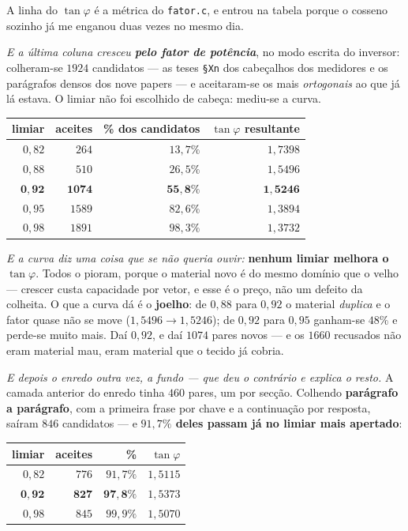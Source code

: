 \documentclass[11pt]{article}
\newcommand{\code}[1]{\texttt{\small #1}}
\theoremstyle{plain}
\theoremstyle{remark}
\begin{document}
\begin{itemize}
A linha do $\tan\varphi$ é a métrica do \code{fator.c}, e entrou na tabela porque o cosseno sozinho
já me enganou duas vezes no mesmo dia.

\emph{E a última coluna cresceu \textbf{pelo fator de potência}}, no modo escrita do inversor: colheram-se
$1924$ candidatos --- as teses \code{§Xn} dos cabeçalhos dos medidores e os parágrafos densos dos
nove papers --- e aceitaram-se os mais \emph{ortogonais} ao que já lá estava. O limiar não foi
escolhido de cabeça: mediu-se a curva.

\begin{center}\small
\begin{tabular}{rrrr}
\hline
limiar & aceites & \% dos candidatos & $\tan\varphi$ resultante \\ \hline
$0{,}82$ & $264$ & $13{,}7\%$ & $1{,}7398$ \\
$0{,}88$ & $510$ & $26{,}5\%$ & $1{,}5496$ \\
$\mathbf{0{,}92}$ & $\mathbf{1074}$ & $\mathbf{55{,}8\%}$ & $\mathbf{1{,}5246}$ \\
$0{,}95$ & $1589$ & $82{,}6\%$ & $1{,}3894$ \\
$0{,}98$ & $1891$ & $98{,}3\%$ & $1{,}3732$ \\
\hline
\end{tabular}
\end{center}

\emph{E a curva diz uma coisa que se não queria ouvir:} \textbf{nenhum limiar melhora o
$\tan\varphi$}. Todos o pioram, porque o material novo é do mesmo domínio que o velho --- crescer
custa capacidade por vetor, e esse é o preço, não um defeito da colheita. O que a curva dá é o
\textbf{joelho}: de $0{,}88$ para $0{,}92$ o material \emph{duplica} e o fator quase não se move
($1{,}5496 \to 1{,}5246$); de $0{,}92$ para $0{,}95$ ganham-se $48\%$ e perde-se muito mais. Daí
$0{,}92$, e daí $1074$ pares novos --- e os $1660$ recusados não eram material mau, eram material
que o tecido já cobria.

\emph{E depois o enredo outra vez, a fundo --- que deu o contrário e explica o resto.} A camada
anterior do enredo tinha $460$ pares, um por secção. Colhendo \textbf{parágrafo a parágrafo}, com a
primeira frase por chave e a continuação por resposta, saíram $846$ candidatos --- e
\textbf{$91{,}7\%$ deles passam já no limiar mais apertado}:

\begin{center}\small
\begin{tabular}{rrrr}
\hline
limiar & aceites & \% & $\tan\varphi$ \\ \hline
$0{,}82$ & $776$ & $91{,}7\%$ & $1{,}5115$ \\
$\mathbf{0{,}92}$ & $\mathbf{827}$ & $\mathbf{97{,}8\%}$ & $1{,}5373$ \\
$0{,}98$ & $845$ & $99{,}9\%$ & $1{,}5070$ \\
\hline
\end{tabular}
\end{center}


\end{itemize}
\end{document}
